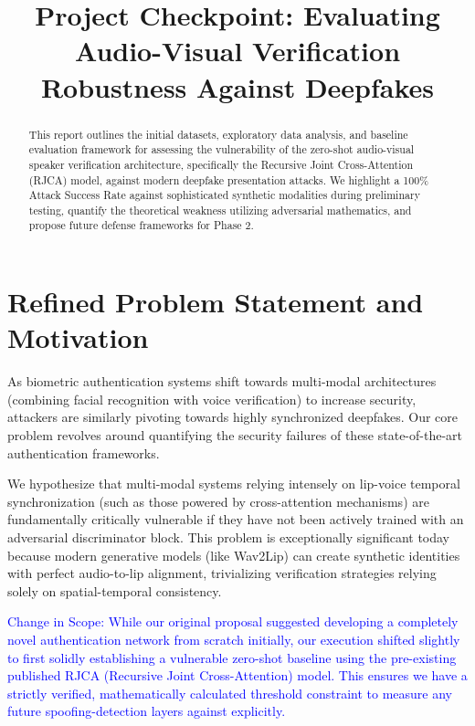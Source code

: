 \documentclass[conference]{IEEEtran}
\begin{document}
\title{Project Checkpoint: Evaluating Audio-Visual Verification Robustness Against Deepfakes}

\author{
}

\maketitle

\begin{abstract}
This report outlines the initial datasets, exploratory data analysis, and baseline evaluation framework for assessing the vulnerability of the zero-shot audio-visual speaker verification architecture, specifically the Recursive Joint Cross-Attention (RJCA) model, against modern deepfake presentation attacks. We highlight a 100\% Attack Success Rate against sophisticated synthetic modalities during preliminary testing, quantify the theoretical weakness utilizing adversarial mathematics, and propose future defense frameworks for Phase 2.
\end{abstract}

\section{Refined Problem Statement and Motivation}
As biometric authentication systems shift towards multi-modal architectures (combining facial recognition with voice verification) to increase security, attackers are similarly pivoting towards highly synchronized deepfakes. Our core problem revolves around quantifying the security failures of these state-of-the-art authentication frameworks. 

We hypothesize that multi-modal systems relying intensely on lip-voice temporal synchronization (such as those powered by cross-attention mechanisms) are fundamentally critically vulnerable if they have not been actively trained with an adversarial discriminator block. This problem is exceptionally significant today because modern generative models (like Wav2Lip) can create synthetic identities with perfect audio-to-lip alignment, trivializing verification strategies relying solely on spatial-temporal consistency. 

\textcolor{blue}{Change in Scope: While our original proposal suggested developing a completely novel authentication network from scratch initially, our execution shifted slightly to first solidly establishing a vulnerable zero-shot baseline using the pre-existing published RJCA (Recursive Joint Cross-Attention) model. This ensures we have a strictly verified, mathematically calculated threshold constraint to measure any future spoofing-detection layers against explicitly.}
\end{document}
